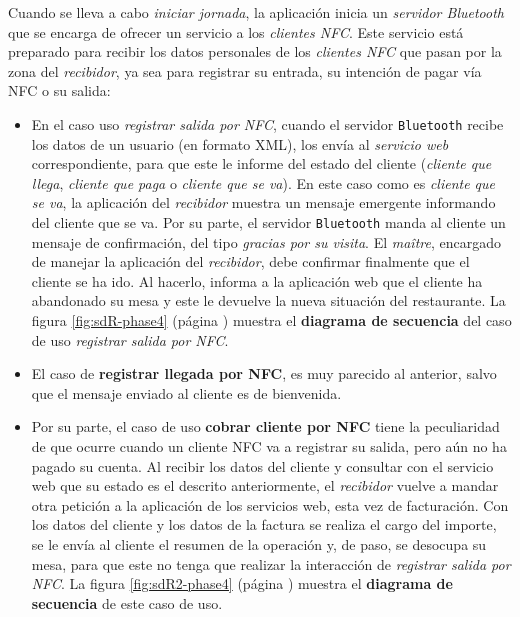 Cuando se lleva a cabo \emph{iniciar jornada}, la aplicación inicia un
\emph{servidor Bluetooth} que se encarga de ofrecer un servicio a los
\emph{clientes \acs{NFC}}. Este servicio está preparado para recibir
los datos personales de los \emph{clientes \acs{NFC}} que pasan por la
zona del \emph{recibidor}, ya sea para registrar su entrada, su intención de
pagar vía \acs{NFC} o su salida:
\begin{itemize}
\item En el caso uso \emph{registrar salida por \acs{NFC}}, cuando el 
servidor \texttt{Bluetooth} recibe los datos de un usuario (en formato
\acs{XML}), los envía al \emph{servicio web} correspondiente, para que este le 
informe del estado del cliente (\emph{cliente que llega}, \emph{cliente que 
paga} o \emph{cliente que se va}). En este caso como es \emph{cliente que se 
va}, la aplicación del \emph{recibidor} muestra un mensaje emergente informando 
del cliente que se va. Por su parte, el servidor \texttt{Bluetooth} manda al 
cliente un mensaje de confirmación, del tipo \emph{gracias por su visita}. El 
\emph{maître}, encargado de manejar la aplicación del \emph{recibidor}, debe 
confirmar finalmente que el cliente se ha ido. Al hacerlo, informa a la 
aplicación web que el cliente ha abandonado su mesa y este le devuelve la nueva 
situación del restaurante. La figura \ref{fig:sdR-phase4} (página
\pageref{fig:sdR-phase4}) muestra el \textbf{diagrama de secuencia} del caso de 
uso \emph{registrar salida por \acs{NFC}}.

\item El caso de \textbf{registrar llegada por \acs{NFC}}, es muy parecido al
anterior, salvo que el mensaje enviado al cliente es de bienvenida.
\item Por su parte, el caso de uso \textbf{cobrar cliente por \acs{NFC}} tiene
la peculiaridad de que ocurre cuando un cliente \acs{NFC} va a registrar su
salida, pero aún no ha pagado su cuenta. Al recibir los datos del cliente y
consultar con el servicio web que su estado es el descrito anteriormente, el
\emph{recibidor} vuelve a mandar otra petición a la aplicación de los servicios
web, esta vez de facturación. Con los datos del cliente y los datos de la
factura se realiza el cargo del importe, se le envía al cliente el resumen de
la operación y, de paso, se desocupa su mesa, para que este no tenga que
realizar la interacción de \emph{registrar salida por \acs{NFC}}. La figura
\ref{fig:sdR2-phase4} (página \pageref{fig:sdR2-phase4}) muestra el
\textbf{diagrama de secuencia} de este caso de uso.
\end{itemize}

